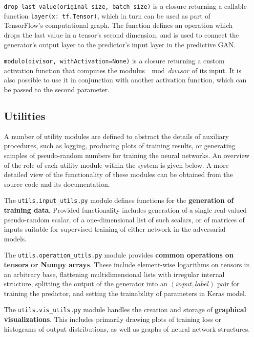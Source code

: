 \documentclass[12pt, titlepage]{report}
\theoremstyle{definition}
\begin{document}
\texttt{drop_last_value(original_size, batch_size)} is a closure returning a callable function \texttt{layer(x: tf.Tensor)}, which in turn can be used as part of TensorFlow's computational graph. The function defines an operation which drops the last value in a tensor's second dimension, and is used to connect the generator's output layer to the predictor's input layer in the predictive GAN.

\texttt{modulo(divisor, withActivation=None)} is a closure returning a custom activation function that computes the modulus $\mod{divisor}$ of its input. It is also possible to use it in conjunction with another activation function, which can be passed to the second parameter.


\subsection{Utilities}
A number of utility modules are defined to abstract the details of auxiliary procedures, such as logging, producing plots of training results, or generating samples of pseudo-random numbers for training the neural networks. An overview of the role of each utility module within the system is given below. A more detailed view of the functionality of these modules can be obtained from the source code and its documentation.

The \texttt{utils.input_utils.py} module defines functions for the \textbf{generation of training data}. Provided functionality includes generation of a single real-valued pseudo-random scalar, of a one-dimensional list of such scalars, or of matrices of inputs suitable for supervised training of either network in the adversarial models.

The \texttt{utils.operation_utils.py} module provides \textbf{common operations on tensors or Numpy arrays}. These include element-wise logarithms on tensors in an arbitrary base, flattening multidimensional lists with irregular internal structure, splitting the output of the generator into an $(input, label)$ pair for training the predictor, and setting the trainability of parameters in Keras model.

The \texttt{utils.vis_utils.py} module handles the creation and storage of \textbf{graphical visualizations}. This includes primarily drawing plots of training loss or histograms of output distributions, as well as graphs of neural network structures.
\end{document}
